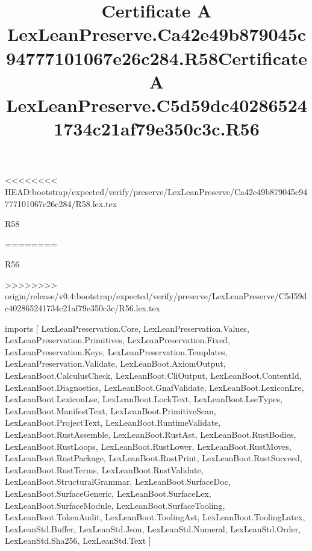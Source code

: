 <<<<<<<< HEAD:bootstrap/expected/verify/preserve/LexLeanPreserve/Ca42e49b879045c94777101067e26c284/R58.lex.tex
\begin{lexlean}{R58}
\title{Certificate A LexLeanPreserve.Ca42e49b879045c94777101067e26c284.R58}
========
\begin{lexlean}{R56}
\title{Certificate A LexLeanPreserve.C5d59dc402865241734c21af79e350c3c.R56}
>>>>>>>> origin/release/v0.4:bootstrap/expected/verify/preserve/LexLeanPreserve/C5d59dc402865241734c21af79e350c3c/R56.lex.tex
\begin{coremodule}
imports [
  LexLeanPreservation.Core,
  LexLeanPreservation.Values,
  LexLeanPreservation.Primitives,
  LexLeanPreservation.Fixed,
  LexLeanPreservation.Keys,
  LexLeanPreservation.Templates,
  LexLeanPreservation.Validate,
  LexLeanBoot.AxiomOutput,
  LexLeanBoot.CalculusCheck,
  LexLeanBoot.CliOutput,
  LexLeanBoot.ContentId,
  LexLeanBoot.Diagnostics,
  LexLeanBoot.GnafValidate,
  LexLeanBoot.LexiconLre,
  LexLeanBoot.LexiconLse,
  LexLeanBoot.LockText,
  LexLeanBoot.LseTypes,
  LexLeanBoot.ManifestText,
  LexLeanBoot.PrimitiveScan,
  LexLeanBoot.ProjectText,
  LexLeanBoot.RuntimeValidate,
  LexLeanBoot.RustAssemble,
  LexLeanBoot.RustAst,
  LexLeanBoot.RustBodies,
  LexLeanBoot.RustLoops,
  LexLeanBoot.RustLower,
  LexLeanBoot.RustMoves,
  LexLeanBoot.RustPackage,
  LexLeanBoot.RustPrint,
  LexLeanBoot.RustSucceed,
  LexLeanBoot.RustTerms,
  LexLeanBoot.RustValidate,
  LexLeanBoot.StructuralGrammar,
  LexLeanBoot.SurfaceDoc,
  LexLeanBoot.SurfaceGeneric,
  LexLeanBoot.SurfaceLex,
  LexLeanBoot.SurfaceModule,
  LexLeanBoot.SurfaceTooling,
  LexLeanBoot.TokenAudit,
  LexLeanBoot.ToolingAst,
  LexLeanBoot.ToolingLatex,
  LexLeanStd.Buffer,
  LexLeanStd.Json,
  LexLeanStd.Numeral,
  LexLeanStd.Order,
  LexLeanStd.Sha256,
  LexLeanStd.Text
]


\end{coremodule}
\end{lexlean}
\end{lexlean}

